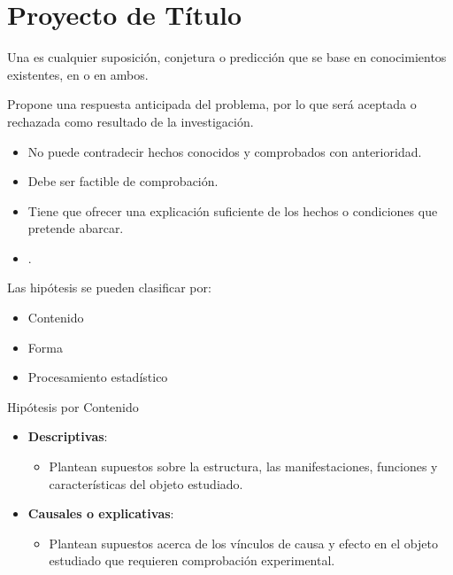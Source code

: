 \chapter{Proyecto de Título}
Una  es cualquier suposición, conjetura o predicción que se base en conocimientos existentes, en  o en ambos.

 Propone una respuesta anticipada del problema, por lo que será aceptada o rechazada como resultado de la investigación.

\begin{itemize}
  \item No puede contradecir hechos conocidos y comprobados con anterioridad.
  \item Debe ser factible de comprobación.
  \item Tiene que ofrecer una explicación suficiente de los hechos o condiciones que pretende abarcar.
  \item {}.
\end{itemize}

Las hipótesis se pueden clasificar por:
 \begin{itemize}
  \item Contenido
  \item Forma
  \item Procesamiento estadístico
\end{itemize}

Hipótesis por Contenido
\begin{itemize}
  \item \textbf{Descriptivas}:
  \begin{itemize}
  \item Plantean supuestos sobre la estructura, las manifestaciones, funciones y características del objeto estudiado.
\end{itemize}

  \item \textbf{Causales o explicativas}:
  \begin{itemize}
  \item Plantean supuestos acerca de los vínculos de causa y efecto en el objeto estudiado que requieren comprobación experimental.
\end{itemize}

\end{itemize}


